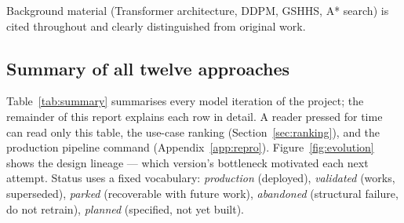 \documentclass[11pt,a4paper]{article}
\begin{document}
Background material (Transformer architecture, DDPM, GSHHS, A* search)
is cited throughout and clearly distinguished from original work.

\subsection{Summary of all twelve approaches}
\label{sec:summary}

Table~\ref{tab:summary} summarises every model iteration of the project; the
remainder of this report explains each row in detail.
A reader pressed for time can read only this table, the use-case ranking
(Section~\ref{sec:ranking}), and the production pipeline command
(Appendix~\ref{app:repro}).
Figure~\ref{fig:evolution} shows the design lineage --- which version's
bottleneck motivated each next attempt.
Status uses a fixed vocabulary:
\emph{production} (deployed), \emph{validated} (works, superseded),
\emph{parked} (recoverable with future work), \emph{abandoned}
(structural failure, do not retrain), \emph{planned} (specified, not yet built).
\end{document}
